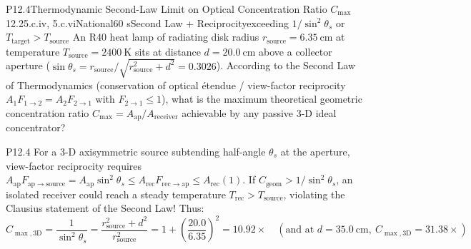 \begin{problem}{P12.4}{Thermodynamic Second-Law Limit on Optical Concentration Ratio $C_{\max}$}{12.2}{5.c.iv, 5.c.vi}{National}{60 s}{Second Law + Reciprocity}{exceeding $1/\sin^2\theta_s$ or $T_{\mathrm{target}} > T_{\mathrm{source}}$}
An R40 heat lamp of radiating disk radius $r_{\mathrm{source}} = \SI{6.35}{\centi\meter}$ at temperature $T_{\mathrm{source}} = \SI{2400}{\kelvin}$ sits at distance $d = \SI{20.0}{\centi\meter}$ above a collector aperture ($\sin\theta_s = r_{\mathrm{source}}/\sqrt{r_{\mathrm{source}}^2 + d^2} = 0.3026$). According to the Second Law of Thermodynamics (conservation of optical \'etendue / view-factor reciprocity $A_1 F_{1\to 2} = A_2 F_{2\to 1}$ with $F_{2\to 1} \le 1$), what is the maximum theoretical geometric concentration ratio $C_{\max} = A_{\mathrm{ap}}/A_{\mathrm{receiver}}$ achievable by any passive 3-D ideal concentrator?
\end{problem}
\begin{solution}{P12.4}
For a 3-D axisymmetric source subtending half-angle $\theta_s$ at the aperture, view-factor reciprocity requires $A_{\mathrm{ap}} F_{\mathrm{ap}\to\mathrm{source}} = A_{\mathrm{ap}}\sin^2\theta_s \le A_{\mathrm{rec}} F_{\mathrm{rec}\to\mathrm{ap}} \le A_{\mathrm{rec}}(1)$. If $C_{\mathrm{geom}} > 1/\sin^2\theta_s$, an isolated receiver could reach a steady temperature $T_{\mathrm{rec}} > T_{\mathrm{source}}$, violating the Clausius statement of the Second Law! Thus:
\[
  C_{\max,\mathrm{3D}} = \frac{1}{\sin^2\theta_s} = \frac{r_{\mathrm{source}}^2 + d^2}{r_{\mathrm{source}}^2} = 1 + \left(\frac{20.0}{6.35}\right)^{\!2} = \mathbf{10.92\times} \quad (\text{and at } d = \SI{35.0}{\centi\meter},\ C_{\max,\mathrm{3D}} = \mathbf{31.38\times})
\]
\end{solution}

